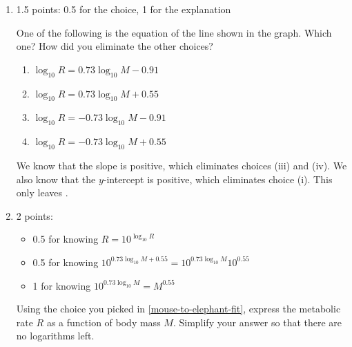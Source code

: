 \documentclass{article}
\begin{document}
\begin{enumerate}
\begin{enumerate}
    \pspace{\newpage}

  \item \label{mouse-to-elephant-fit}

    \begin{grading}
      1.5 points: 0.5 for the choice, 1 for the explanation
    \end{grading}

    \begin{problem}[\stretch{0.35}]
      One of the following is the equation of the line shown in the graph. Which one? How did you eliminate the other choices?
      \begin{enumerate}
      \item $\log_{10} R = 0.73 \log_{10} M - 0.91$
      \item $\log_{10} R = 0.73 \log_{10} M + 0.55$
      \item $\log_{10} R = -0.73 \log_{10} M - 0.91$
      \item $\log_{10} R = -0.73 \log_{10} M + 0.55$
      \end{enumerate}      
    \end{problem}

    \begin{solution}
      We know that the slope is positive, which eliminates
      choices (iii) and (iv). We also know that the $y$-intercept
      is positive, which eliminates choice (i). This only
      leaves .
    \end{solution}

  \item

    \begin{grading}
      2 points:
      \begin{itemize}[nosep]
      \item 0.5 for knowing $R = 10^{\log_{10} R}$
      \item 0.5 for knowing $10^{0.73 \log_{10} M +0.55 } = 10^{0.73 \log_{10} M} 10^{0.55}$
      \item 1 for knowing $10^{0.73 \log_{10} M} = M^{0.55}$
      \end{itemize}
    \end{grading}

    \begin{problem}[\vfill]
      Using the choice you picked in \ref{mouse-to-elephant-fit}, express the metabolic rate $R$ as a function of body mass $M$. Simplify your answer so that there are no logarithms left. 
    \end{problem}


\end{enumerate}
\end{enumerate}
\end{document}

